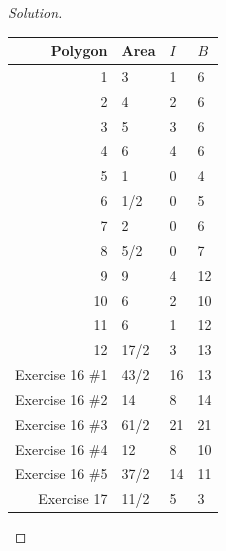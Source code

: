 \documentclass[12pt]{article}
\newenvironment{exercise}[2][Exercise]{\begin{trivlist}
        \item[\hskip \labelsep {\bfseries #1}\hskip \labelsep {\bfseries #2.}]}{\end{trivlist}}
\newenvironment{solution}
        {\begin{proof}[Solution]}
                    {\end{proof}}
\begin{document}
\begin{exercise}{15}
\begin{solution}
\begin{center}
        \end{center}
        \begin{center}
            \begin{tabular}{| r | l | l | l |}
                \hline
                Polygon \hspace{.75cm} & Area\hspace{1.25cm} & \( I \) \hspace{1.75cm} & \( B \) \hspace{1.75cm} \\ [.5ex]
                \hline\hline
                1 & 3 & 1 & 6\\ [3ex]
                \hline
                2 & 4 & 2 & 6\\ [3ex]
                \hline
                3 & 5 & 3 & 6\\ [3ex]
                \hline
                4 & 6 & 4 & 6\\ [3ex]
                \hline
                5 & 1 & 0 & 4\\ [3ex]
                \hline
                6 & 1/2 & 0 & 5\\ [3ex]
                \hline
                7 & 2 & 0 & 6\\ [3ex]
                \hline
                8 & 5/2 & 0 & 7\\ [3ex]
                \hline
                9 & 9 & 4 & 12\\ [3ex]
                \hline
                10 & 6 & 2 & 10\\ [3ex]
                \hline
                11 & 6 & 1 & 12\\ [3ex]
                \hline
                12 & 17/2 & 3 & 13\\ [3ex]
                \hline
                Exercise 16 \#1 & 43/2 & 16 & 13\\ [3ex]
                \hline
                Exercise 16 \#2 & 14 & 8 & 14\\ [3ex]
                \hline
                Exercise 16 \#3 & 61/2 & 21 & 21\\ [3ex]
                \hline
                Exercise 16 \#4 & 12 & 8 & 10\\ [3ex]
                \hline
                Exercise 16 \#5 & 37/2 & 14 & 11\\ [3ex]
                \hline
                Exercise 17 & 11/2 & 5 & 3\\ [3ex]
                \hline
            \end{tabular}
        \end{center}
    \end{solution}
\end{exercise}
\end{document}
